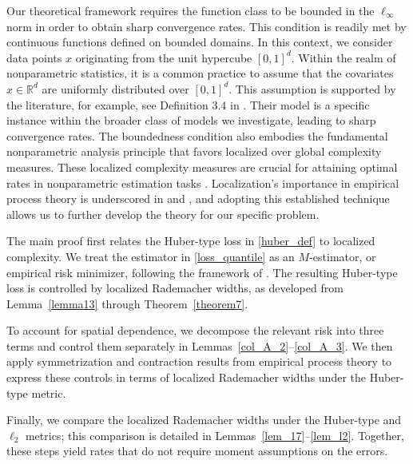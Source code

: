 \documentclass[twoside,11pt]{article}
\newcommand{\rev}[1]{{\color{revisionred}#1}}
\newenvironment{revision}{\color{revisionred}}{}
\begin{document}
\rev{Our theoretical framework requires the function class to be bounded in the $\ell_{\infty}$ norm in order to obtain sharp convergence rates.} This condition is readily met by continuous functions defined on bounded domains. In this context, we consider data points $x$ originating from the unit hypercube $[0,1]^d$. Within the realm of nonparametric statistics, it is a common practice to assume that the covariates $x \in \mathbb{R}^d$ are uniformly distributed over $[0,1]^d$. This assumption is supported by the literature, for example, see Definition 3.4 in \cite{gyorfi2002distribution}. Their model is a specific instance within the broader class of models we investigate, leading to sharp convergence rates. 
The boundedness condition also embodies the fundamental nonparametric analysis principle that favors localized over global complexity measures. These localized complexity measures are crucial for attaining optimal rates in nonparametric estimation tasks \cite{koltchinskii2001rademacher, koltchinskii2006local, bartlett2005local, mendelson2002geometric, bartlett2002rademacher}. Localization's importance in empirical process theory is underscored in \cite{alexander1987rates} and \cite{geer2000empirical}, and adopting this established technique allows us to further develop the theory for our specific problem.

\begin{revision}
The main proof first relates the Huber-type loss in \eqref{huber_def} to localized complexity. We treat the estimator in \eqref{loss_quantile} as an \(M\)-estimator, or empirical risk minimizer, following the framework of \cite{mammen1997locally}. The resulting Huber-type loss is controlled by localized Rademacher widths, as developed from Lemma~\ref{lemma13} through Theorem~\ref{theorem7}.

To account for spatial dependence, we decompose the relevant risk into three terms and control them separately in Lemmas~\ref{col_A_2}--\ref{col_A_3}. We then apply symmetrization and contraction results from empirical process theory to express these controls in terms of localized Rademacher widths under the Huber-type metric.

Finally, we compare the localized Rademacher widths under the Huber-type and \(\ell_2\) metrics; this comparison is detailed in Lemmas~\ref{lem_17}--\ref{lem_l2}. Together, these steps yield rates that do not require moment assumptions on the errors.
\end{revision}
\end{document}
